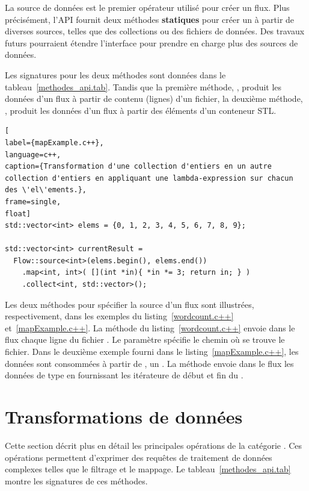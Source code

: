 La source de donn\'ees est le premier op\'erateur utilis\'e pour cr\'eer un flux. 
%
%
Plus pr\'ecis\'ement, 
l'API fournit deux m\'ethodes {\bf statiques} pour cr\'eer un  \`a partir de diverses sources, telles que des collections ou des fichiers de donn\'ees. Des travaux futurs pourraient \'etendre l'interface pour prendre en charge plus des sources de donn\'ees.


Les signatures pour les deux m\'ethodes sont donn\'ees dans le tableau~\ref{methodes_api.tab}. Tandis que la premi\`ere m\'ethode, , produit les donn\'ees d'un flux \`a partir de contenu (lignes) d'un fichier, la deuxi\`eme m\'ethode, , produit les donn\'ees d'un flux \`a partir des \'el\'ements d'un conteneur STL.


\begin{lstlisting}[
label={mapExample.c++},
language=c++,
caption={Transformation d'une collection d'entiers en un autre collection d'entiers en appliquant une lambda-expression sur chacun des \'el\'ements.},
frame=single,
float]
std::vector<int> elems = {0, 1, 2, 3, 4, 5, 6, 7, 8, 9};

std::vector<int> currentResult =
  Flow::source<int>(elems.begin(), elems.end())
    .map<int, int>( [](int *in){ *in *= 3; return in; } )
    .collect<int, std::vector>();            
\end{lstlisting}



Les deux m\'ethodes pour sp\'ecifier la source d'un flux sont illustr\'ees, respectivement, dans les exemples du listing~\ref{wordcount.c++} et~\ref{mapExample.c++}. La m\'ethode  du listing~\ref{wordcount.c++} envoie dans le flux chaque ligne du fichier . Le param\`etre  sp\'ecifie le chemin o\`u se trouve le fichier. Dans le deuxième exemple fourni dans le listing~\ref{mapExample.c++}, les donn\'ees sont consomm\'ees \`a partir de , un . La m\'ethode  envoie dans le flux les donn\'ees de type  en fournissant les it\'erateure de d\'ebut et fin du .


\section{Transformations de donn\'ees}

Cette section d\'ecrit plus en d\'etail les principales op\'erations de la cat\'egorie . Ces op\'erations permettent d'exprimer des requ\^etes de traitement de donn\'ees complexes telles que le filtrage et le mappage. Le tableau~\ref{methodes_api.tab} montre les signatures de ces méthodes. 


